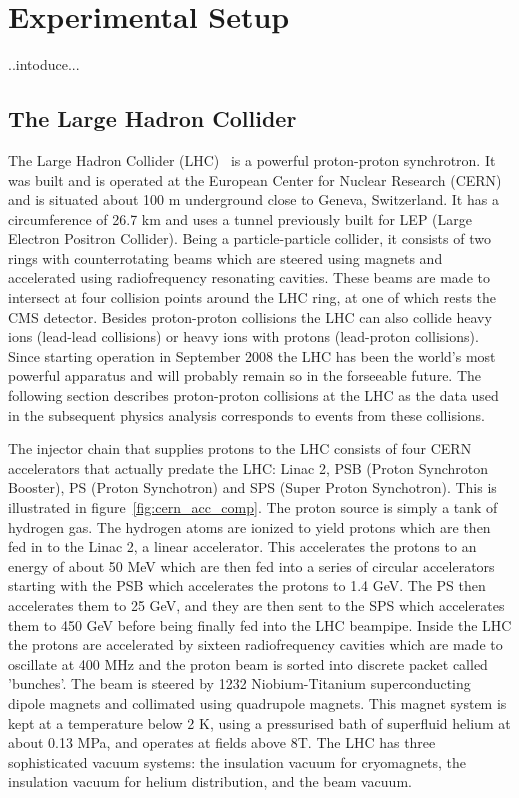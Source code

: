 
\chapter{Experimental Setup}
\label{chap:exper_setup}
..intoduce...
\section{The Large Hadron Collider}
\label{sec:LHC}

The Large Hadron Collider (LHC)~\cite{lhcmachine} is a powerful proton-proton synchrotron. It was built and is operated at the European Center for Nuclear Research (CERN) and is situated about 100 m underground close to Geneva, Switzerland. It has a circumference of 26.7 km and uses a tunnel previously built for LEP (Large Electron Positron Collider). Being a particle-particle collider, it consists of two rings with counterrotating beams which are steered using magnets and accelerated using radiofrequency resonating cavities. These beams are made to intersect at four collision points around the LHC ring, at one of which rests the CMS detector. Besides proton-proton collisions the LHC can also collide heavy ions (lead-lead collisions) or heavy ions with protons (lead-proton collisions). Since starting operation in September 2008 the LHC has been the world's most powerful apparatus and will probably remain so in the forseeable future. The following section describes proton-proton collisions at the LHC as the data used in the subsequent physics analysis corresponds to events from these collisions.

The injector chain that supplies protons to the LHC consists of four CERN accelerators that actually predate the LHC: Linac 2, PSB (Proton Synchroton Booster), PS (Proton Synchotron) and SPS (Super Proton Synchotron). This is illustrated in figure~\ref{fig:cern_acc_comp}. The proton source is simply a tank of hydrogen gas. The hydrogen atoms are ionized to yield protons which are then fed in to the Linac 2, a linear accelerator. This accelerates the protons to an energy of about 50 MeV which are then fed into a series of circular accelerators starting with the PSB which accelerates the protons to 1.4 GeV. The PS then accelerates them to 25 GeV, and they are then sent to the SPS which accelerates them to 450 GeV before being finally fed into the LHC beampipe. Inside the LHC the protons are accelerated by sixteen radiofrequency cavities which are made to oscillate at 400 MHz and the proton beam is sorted into discrete packet called 'bunches'. The beam is steered by 1232 Niobium-Titanium superconducting dipole magnets and collimated using quadrupole magnets. This magnet system is kept at a temperature below 2 K, using a pressurised bath of superfluid helium at about 0.13 MPa, and operates at fields above 8T. The LHC has three sophisticated vacuum systems: the insulation vacuum for cryomagnets, the insulation vacuum for  helium  distribution, and the beam vacuum.

